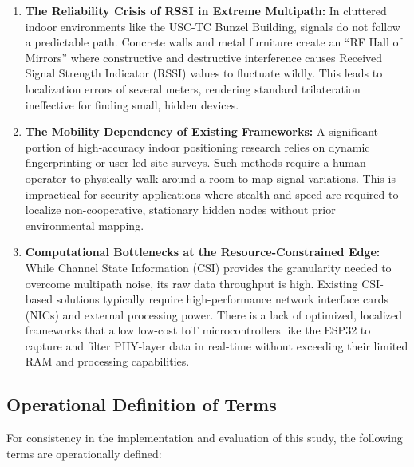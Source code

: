 \begin{enumerate}
    \item \textbf{The Reliability Crisis of RSSI in Extreme Multipath:} In cluttered indoor environments like the USC-TC Bunzel Building, signals do not follow a predictable path. Concrete walls and metal furniture create an ``RF Hall of Mirrors'' where constructive and destructive interference causes Received Signal Strength Indicator (RSSI) values to fluctuate wildly. This leads to localization errors of several meters, rendering standard trilateration ineffective for finding small, hidden devices.
    
    \item \textbf{The Mobility Dependency of Existing Frameworks:} A significant portion of high-accuracy indoor positioning research relies on dynamic fingerprinting or user-led site surveys. Such methods require a human operator to physically walk around a room to map signal variations. This is impractical for security applications where stealth and speed are required to localize non-cooperative, stationary hidden nodes without prior environmental mapping.
    
    \item \textbf{Computational Bottlenecks at the Resource-Constrained Edge:} While Channel State Information (CSI) provides the granularity needed to overcome multipath noise, its raw data throughput is high. Existing CSI-based solutions typically require high-performance network interface cards (NICs) and external processing power. There is a lack of optimized, localized frameworks that allow low-cost IoT microcontrollers like the ESP32 to capture and filter PHY-layer data in real-time without exceeding their limited RAM and processing capabilities.
\end{enumerate}

\subsection{Operational Definition of Terms}

For consistency in the implementation and evaluation of this study, the following terms are operationally defined:

